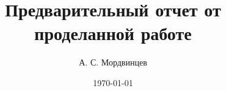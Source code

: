 \documentclass[a4paper,14pt]{extreport}
\begin{document}
\title{Предварительный отчет от проделанной работе}
\author{А. С. Мордвинцев}
\date{\today}


\sloppy  %

\maketitle

\setcounter{page}{3}

\tableofcontents





%
%
%
%
%



\end{document}
